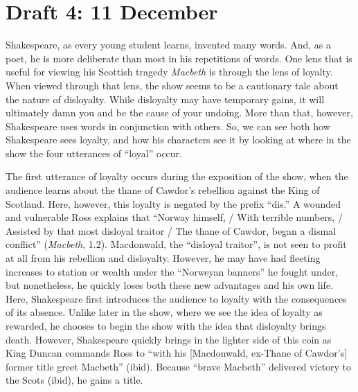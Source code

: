 \documentclass[12pt]{article}[titlepage]
\newcommand{\say}[1]{``#1''}
\newcommand{\1}{\={a}}
\newcommand{\2}{\={e}}
\newcommand{\3}{\={\i}}
\newcommand{\4}{\=o}
\newcommand{\5}{\=u}
\newcommand{\6}{\={A}}
\renewcommand{\,}{\textsuperscript{,}}
\begin{document}
\section{Draft 4: 11 December}
Shakespeare, as every young student learns, invented many words.
And, as a poet, he is more deliberate than most in his repetitions of words.
One lens that is useful for viewing his Scottish tragedy \textit{Macbeth} is through the lens of loyalty.
When viewed through that lens, the show seems to be a cautionary tale about the nature of disloyalty.
While disloyalty may have temporary gains, it will ultimately damn you and be the cause of your undoing.
More than that, however, Shakespeare uses words in conjunction with others.
So, we can see both how Shakespeare sees loyalty, and how his characters see it by looking at where in the show the four utterances of \say{loyal} occur.

The first utterance of loyalty occurs during the exposition of the show, when the audience learns about the thane of Cawdor's rebellion against the King of Scotland.
Here, however, this loyalty is negated by the prefix \say{dis.}
A wounded and vulnerable Ross explains that \say{Norway himself, / With terrible numbers, / Assisted by that most disloyal traitor / The thane of Cawdor, began a dismal conflict} (\textit{Macbeth}, 1.2).
Macdonwald, the \say{disloyal traitor}, is not seen to profit at all from his rebellion and disloyalty.
However, he may have had fleeting increases to station or wealth under the \say{Norweyan banners} he fought under, but nonetheless, he quickly loses both these new advantages and his own life.
Here, Shakespeare first introduces the audience to loyalty with the consequences of its absence.
Unlike later in the show, where we see the idea of loyalty as rewarded, he chooses to begin the show with the idea that disloyalty brings death.
However, Shakespeare quickly brings in the lighter side of this coin as King Duncan commands Ross to \say{with his [Macdonwald, ex-Thane of Cawdor's] former title greet Macbeth} (ibid).
Because \say{brave Macbeth} delivered victory to the Scots (ibid), he gains a title.
\end{document}
